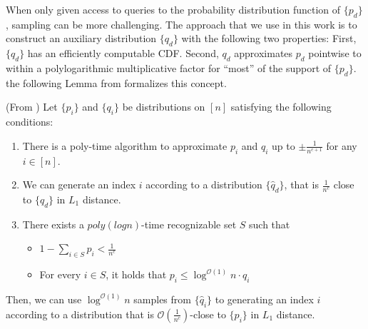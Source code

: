 When only given access to queries to the probability distribution function of $\{p_d\}$, sampling can be more challenging.
The approach that we use in this work is to construct an auxiliary distribution $\{q_d\}$ with the following two properties:
First, $\{ q_d\}$ has an efficiently computable CDF.
Second, $q_d$ approximates $p_d$ pointwise to within a polylogarithmic multiplicative factor for ``most'' of the support of $\{ p_d\}$.
the following Lemma from \cite{huge} formalizes this concept. %
\begin{lemma}
\label{lem:rejection_sampling} (From \cite{huge})
Let $\{p_i\}$ and $\{q_i\}$ be distributions on $[n]$ satisfying the following conditions:
\begin{enumerate}
\item There is a poly-time algorithm to approximate $p_i$ and $q_i$ up to $\pm \frac{1}{n^{c+1}}$ for any $i\in [n]$.
    \item We can generate an index $i$ according to a distribution $\{\hat q_d\}$, that is $ \frac{1}{n^c}$ close to $\{q_d\}$ in $L_1$ distance.
    \item There exists a $poly(log n)$-time recognizable set $S$ such that
    \begin{itemize}
        \item $1-\sum\limits_{i\in S} p_i < \frac 1{n^c}$
        \item For every $i\in S$, it holds that $p_i\le \log^{\mathcal{O}(1)} n\cdot q_i$
    \end{itemize}
\end{enumerate}
Then, we can use $\log^{\mathcal O(1)}n$ samples from $\{\hat q_i\}$ to generating an index $i$
according to a distribution that is $ \mathcal O\left(\frac{1}{n^c}\right)$-close to $\{p_i\}$ in $L_1$ distance.
\end{lemma}
